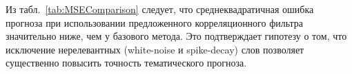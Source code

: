 \documentclass[14pt,a4paper]{article}
\begin{document}
Из табл.~\ref{tab:MSEComparison} следует, что среднеквадратичная ошибка прогноза при использовании предложенного корреляционного фильтра значительно ниже, чем у базового метода. Это подтверждает гипотезу о том, что исключение нерелевантных (white-noise и spike-decay) слов позволяет существенно повысить точность тематического прогноза.






\end{document}
